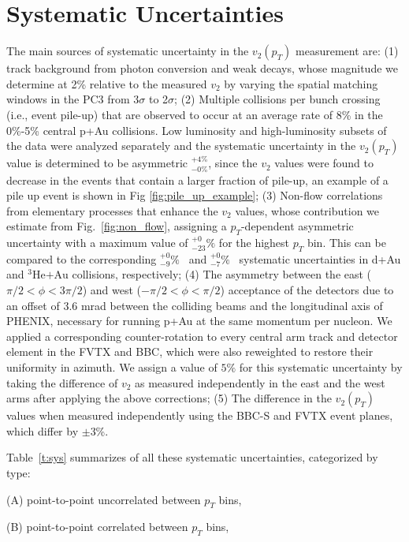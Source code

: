 \section{Systematic Uncertainties}
The main sources of systematic uncertainty in the $v_2(p_T)$ measurement are: (1) track background from photon conversion and weak decays, whose magnitude we determine at 2\% relative to the measured $v_2$ by varying the spatial matching windows in the PC3 from 3$\sigma$ to 2$\sigma$; (2) Multiple collisions per bunch crossing (i.e., event pile-up) that are observed to occur at an average rate of 8\% in the 0\%-5\% central p+Au collisions. Low luminosity and high-luminosity subsets of the data were analyzed separately and the systematic uncertainty in the $v_2(p_T)$ value is determined to be asymmetric  $^{+4\%}_{-0\%}$, since the $v_2$  values were found to decrease in the events that contain a larger fraction of pile-up, an example of a pile up event is shown in Fig \ref{fig:pile_up_example}; (3) Non-flow correlations from elementary processes that enhance the $v_2$ values, whose contribution we estimate from Fig.~\ref{fig:non_flow}, assigning a $p_T$-dependent asymmetric uncertainty with a maximum value of $^{+0}_{-23}\%$ for the highest $p_T$ bin. This can be compared to the corresponding $^{+0}_{-9}\%$~\cite{Adare:2014keg} and $^{+0}_{-7}\%$~\cite{PhysRevLett.115.142301} systematic uncertainties in d+Au and $\mbox{$^3\text{He}$+Au}$ collisions, respectively; (4) The asymmetry between the east ($\pi/2 < \phi < 3\pi/2$) and west ($-\pi/2 < \phi < \pi/2$) acceptance of the detectors due to an offset of 3.6 mrad between the colliding beams and the longitudinal axis of PHENIX, necessary for running p+Au at the same momentum per nucleon. We applied a corresponding counter-rotation to every central arm track and detector element in the FVTX and BBC, which were also reweighted to restore their uniformity in azimuth. We assign a value of $5\%$ for this systematic uncertainty by taking the difference of $v_2$ as measured independently in the east and the west arms after applying the above corrections; (5) The difference in the $v_2(p_T)$ values when measured independently using the BBC-S and FVTX event planes, which differ by $\pm$3\%. 

Table~\ref{t:sys} summarizes of all these systematic
uncertainties, categorized by type:

(A) point-to-point uncorrelated between $p_T$ bins,

(B) point-to-point correlated between $p_T$ bins,

